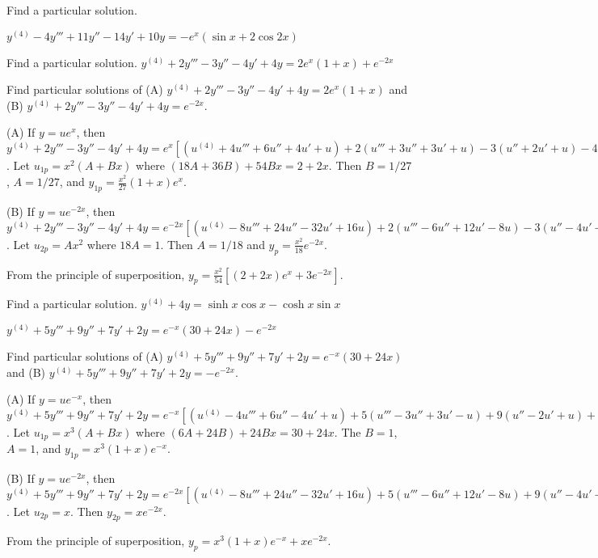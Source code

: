 \documentclass{ximera}
\begin{document}
\begin{problem}\label{exer:9.3.55}   Find a particular solution.

$y^{(4)}-4y'''+11y''-14y'+10y=-e^x(\sin
x+2\cos2x)$
\end{problem}

\begin{problem}\label{exer:9.3.56}   Find a particular solution.   $y^{(4)}+2y'''-3y''-4y'+4y=2e^x(1+x)+e^{-2x}$

\begin{hint}
Find particular solutions of
(A) $y^{(4)}+2y'''-3y''-4y'+4y=2e^x(1+x)$  and
(B) $y^{(4)}+2y'''-3y''-4y'+4y=e^{-2x}$.
\end{hint}

\begin{solution}
(A)
If $y=ue^x$, then $y^{(4)}+2y'''-3y''-4y'+4y=e^x[
(u^{(4)}+4u'''+6u''+4u'+u) +2(u'''+3u''+3u'+u) -3(u''+2u'+u)
-4(u'+u)+4u]=e^x(u^{(4)}+6u'''+9u'')$. Let $u_{1p}=x^2(A+Bx)$
where $(18A+36B)+54Bx=2+2x$. Then $B=1/27$, $A=1/27$, and
$y_{1p}=\frac{x^2}{27}(1+x)e^x$.


(B)
If $y=ue^{-2x}$, then $y^{(4)}+2y'''-3y''-4y'+4y=e^{-2x}[
(u^{(4)}-8u'''+24u''-32u'+16u) +2(u'''-6u''+12u'-8u) -3(u''-4u'+4u)
-4(u'-2u) +4u]=e^{-2x}(u^{(4)}-6u'''+9u'')$. Let $u_{2p}=Ax^2$
where $18A=1$. Then $A=1/18$ and
$y_p=\frac{x^2}{18}e^{-2x}$.


From the principle of superposition,
$y_p=\frac{x^2}{54}[(2+2x)e^x+3e^{-2x}]$.
\end{solution}
\end{problem}

\begin{problem}\label{exer:9.3.57}   Find a particular solution.   $y^{(4)}+4y=\sinh x\cos x-\cosh x\sin x$
\end{problem}

\begin{problem}\label{exer:9.3.58}
$y^{(4)}+5y'''+9y''+7y'+2y=e^{-x}(30+24x)-e^{-2x}$

\begin{hint}
Find particular solutions of
(A) $y^{(4)}+5y'''+9y''+7y'+2y=e^{-x}(30+24x)$ and
(B) $y^{(4)}+5y'''+9y''+7y'+2y=-e^{-2x}$.
\end{hint}

\begin{solution}
(A)
If $y=ue^{-x}$, then $y^{(4)}+5y'''+9y''+7y'+2y=e^{-x}[
(u^{(4)}-4u'''+6u''-4u'+u) +5(u'''-3u''+3u'-u) +9(u''-2u'+u) +7(u'-u)
+2u]=e^{-x}(u^{(4)}+u''')$. Let $u_{1p}=x^3(A+Bx)$ where
$(6A+24B)+24Bx=30+24x$. The $B=1$, $A=1$, and
 $y_{1p}=x^3(1+x)e^{-x}$.


(B)
If $y=ue^{-2x}$, then $y^{(4)}+5y'''+9y''+7y'+2y=e^{-2x}[
(u^{(4)}-8u'''+24u''-32u'+16u) +5(u'''-6u''+12u'-8u) +9(u''-4u'+4u)
+7(u'-2u) +2u]=e^{-2x}(u^{(4)}-3u'''+3u''-u')$. Let $u_{2p}=x$. Then
 $y_{2p}=xe^{-2x}$.



From the principle of superposition,
 $y_p=x^3(1+x)e^{-x}+xe^{-2x}$.
\end{solution}
\end{problem}
\end{document}
